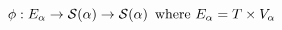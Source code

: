 \documentclass[preview]{standalone}
\begin{document}
\begin{equation*}
  \mathbin{\phi} : E_\alpha \rightarrow \mathcal{S}(\alpha) \rightarrow \mathcal{S}(\alpha) \,
  \text{ where } E_\alpha = T \times V_\alpha
\end{equation*}
\end{document}
